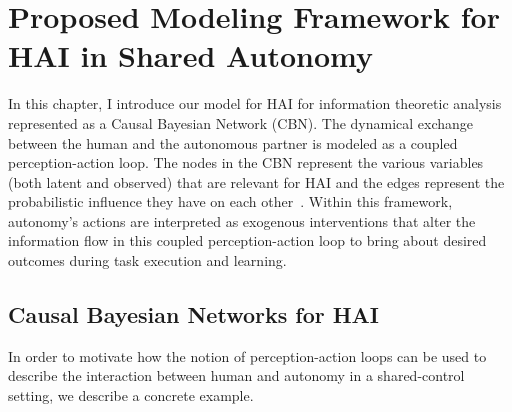 \documentclass[12pt]{article}
\newcommand{\DGc}[1]{{\textbf{\color{blue}{#1}}}}
\begin{document}
% 
%
%
%

%
%
%
%

\pagebreak
\section{Proposed Modeling Framework for HAI in Shared Autonomy}
In this chapter, I introduce our model for HAI for information theoretic analysis represented as a Causal Bayesian Network (CBN). The dynamical exchange between the human and the autonomous partner is modeled as a coupled perception-action loop. The nodes in the CBN represent the various variables (both latent and observed) that are relevant for HAI and the edges represent the probabilistic influence they have on each other~\cite{tishby2011information}. 
Within this framework, autonomy's actions are interpreted as exogenous interventions that alter the information flow in this coupled perception-action loop to bring about desired outcomes during task execution and learning.


\subsection{Causal Bayesian Networks for HAI}

In order to motivate how the notion of perception-action loops can be used to describe the interaction between human and autonomy in a shared-control setting, we describe a concrete example.
\end{document}
